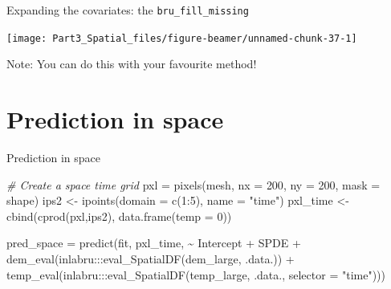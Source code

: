 \documentclass[
  ignorenonframetext,
]{beamer}
\newenvironment{Shaded}{\begin{snugshade}}{\end{snugshade}}
\newcommand{\AttributeTok}[1]{\textcolor[rgb]{0.77,0.63,0.00}{#1}}
\newcommand{\CommentTok}[1]{\textcolor[rgb]{0.56,0.35,0.01}{\textit{#1}}}
\newcommand{\DecValTok}[1]{\textcolor[rgb]{0.00,0.00,0.81}{#1}}
\newcommand{\FunctionTok}[1]{\textcolor[rgb]{0.00,0.00,0.00}{#1}}
\newcommand{\NormalTok}[1]{#1}
\newcommand{\OtherTok}[1]{\textcolor[rgb]{0.56,0.35,0.01}{#1}}
\newcommand{\SpecialCharTok}[1]{\textcolor[rgb]{0.00,0.00,0.00}{#1}}
\newcommand{\StringTok}[1]{\textcolor[rgb]{0.31,0.60,0.02}{#1}}
\begin{document}
\begin{frame}{Expanding the covariates: the \texttt{bru\_fill\_missing}}
\protect\hypertarget{expanding-the-covariates-the-bru_fill_missing-1}{}
\begin{center}\texttt{[image: Part3\_Spatial\_files/figure-beamer/unnamed-chunk-37-1]} \end{center}

Note: You can do this with your favourite method!
\end{frame}

\hypertarget{prediction-in-space}{%
\section{Prediction in space}\label{prediction-in-space}}

\begin{frame}[fragile]{Prediction in space}
\tiny

\begin{Shaded}
\begin{Highlighting}[]
\CommentTok{\# Create a space time grid }
\NormalTok{pxl }\OtherTok{=} \FunctionTok{pixels}\NormalTok{(mesh, }\AttributeTok{nx =} \DecValTok{200}\NormalTok{, }\AttributeTok{ny =} \DecValTok{200}\NormalTok{, }\AttributeTok{mask =}\NormalTok{ shape)}
\NormalTok{ips2 }\OtherTok{\textless{}{-}} \FunctionTok{ipoints}\NormalTok{(}\AttributeTok{domain =} \FunctionTok{c}\NormalTok{(}\DecValTok{1}\SpecialCharTok{:}\DecValTok{5}\NormalTok{), }\AttributeTok{name =} \StringTok{"time"}\NormalTok{)}
\NormalTok{pxl\_time }\OtherTok{\textless{}{-}} \FunctionTok{cbind}\NormalTok{(}\FunctionTok{cprod}\NormalTok{(pxl,ips2), }\FunctionTok{data.frame}\NormalTok{(}\AttributeTok{temp =} \DecValTok{0}\NormalTok{))}

\NormalTok{pred\_space }\OtherTok{=} \FunctionTok{predict}\NormalTok{(fit, pxl\_time, }
                      \SpecialCharTok{\textasciitilde{}}\NormalTok{ Intercept }\SpecialCharTok{+}\NormalTok{ SPDE }\SpecialCharTok{+}
                       \FunctionTok{dem\_eval}\NormalTok{(inlabru}\SpecialCharTok{:::}\FunctionTok{eval\_SpatialDF}\NormalTok{(dem\_large,}
\NormalTok{                                                         .data.)) }\SpecialCharTok{+}
                       \FunctionTok{temp\_eval}\NormalTok{(inlabru}\SpecialCharTok{:::}\FunctionTok{eval\_SpatialDF}\NormalTok{(temp\_large,}
\NormalTok{                                                          .data.,}
                                                          \AttributeTok{selector =} \StringTok{"time"}\NormalTok{)))}
\end{Highlighting}
\end{Shaded}

\normalsize
\end{frame}
\end{document}
